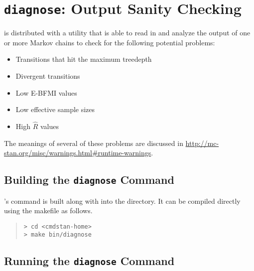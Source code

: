 \chapter{{\tt\bfseries diagnose}: Output Sanity Checking}\label{diagnose.chapter}

\noindent
\CmdStan is distributed with a utility that is able to read in and
analyze the output of one or more Markov chains to check for the
following potential problems:

\begin{itemize}
\item Transitions that hit the maximum treedepth
\item Divergent transitions
\item Low E-BFMI values
\item Low effective sample sizes
\item High $\hat{R}$ values
\end{itemize}

The meanings of several of these problems are discussed in
\url{http://mc-stan.org/misc/warnings.html#runtime-warnings}.

\section{Building the {\tt\bfseries diagnose} Command}

\CmdStan's  command is built along with  into
the  directory. It can be compiled directly using the
makefile as follows.
%
\begin{quote}
\begin{Verbatim}[fontshape=sl]
> cd <cmdstan-home>
> make bin/diagnose
\end{Verbatim}
\end{quote}
%

\section{Running the {\tt\bfseries diagnose} Command}

